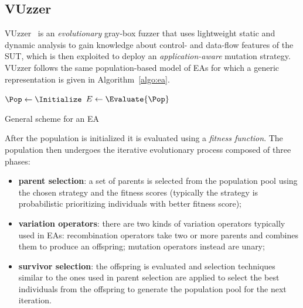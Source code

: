 \subsection{VUzzer}
VUzzer~\cite{rawat2017vuzzer} is an \emph{evolutionary} gray-box fuzzer that
uses lightweight static and dynamic analysis to gain knowledge about control-
and data-flow features of the \ac{SUT}, which is then exploited to deploy an
\emph{application-aware} mutation strategy. VUzzer follows the same
population-based model of \acfp{EA} for which a generic representation is given
in Algorithm~\ref{algo:ea}.

\begin{algorithm}
    \DontPrintSemicolon%

    $\Pop \leftarrow \Initialize$\;
    $E \leftarrow \Evaluate{\Pop}$\;
    \caption{General scheme for an \ac{EA}}
\label{algo:ea}
\end{algorithm}

After the population is initialized it is evaluated using a \emph{fitness
function}. The population then undergoes the iterative evolutionary process
composed of three phases:

\begin{itemize}
    \item \textbf{parent selection}: a set of parents is selected from the
        population pool using the chosen strategy and the fitness scores
        (typically the strategy is probabilistic prioritizing individuals with
        better fitness score);
    \item \textbf{variation operators}: there are two kinds of variation
        operators typically used in \acp{EA}: recombination operators take two
        or more parents and combines them to produce an offspring; mutation
        operators instead are unary;
    \item \textbf{survivor selection}: the offspring is evaluated and selection
        techniques similar to the ones used in parent selection are applied to
        select the best individuals from the offspring to generate the
        population pool for the next iteration.
\end{itemize}

